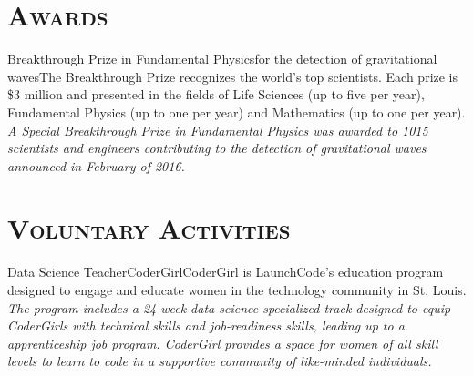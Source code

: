 \documentclass[10pt,a4paper]{moderncv}
\begin{document}
\section{\textsc{Awards}}
 {Breakthrough Prize in Fundamental Physics}{for the detection of gravitational waves}{}{}{The Breakthrough Prize recognizes the world's top scientists. Each prize is \$3 million and presented in the fields of Life Sciences (up to five per year), Fundamental Physics (up to one per year) and Mathematics (up to one per year).\vspace{0.2cm}\\ \textit{A Special Breakthrough Prize in Fundamental Physics was awarded to 1015 scientists and engineers contributing to the detection of gravitational waves announced in February of 2016.}}

\section{\textsc{Voluntary Activities}}
 {Data Science Teacher}{CoderGirl}{}{}{CoderGirl is LaunchCode’s education program designed to engage and educate women in the technology community in St. Louis. \vspace{0.2cm}\\ \textit{The program includes a 24-week data-science specialized track designed to equip CoderGirls with technical skills and job-readiness skills, leading up to a apprenticeship job program. CoderGirl provides a space for women of all skill levels to learn to code in a supportive community of like-minded individuals.}}
\end{document}

